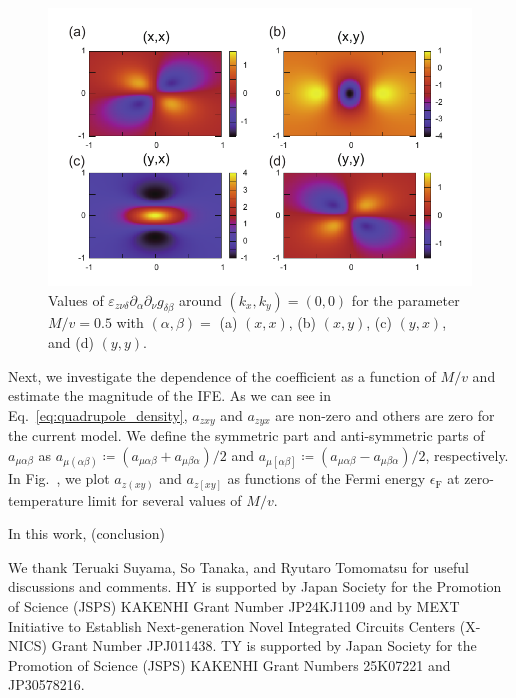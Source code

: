 \documentclass[aps,prb,longbibliography,superscriptaddress,twocolumn]{revtex4-2}
\begin{document}
\begin{figure}[t]
    \begin{center}
        \includegraphics[width=\columnwidth]{fig_IFE/asym_density.pdf}
    \end{center}
    \caption{Values of $\varepsilon_{z\nu\delta}\partial_{\alpha}\partial_{\nu}g_{\delta\beta}$ around $(k_x,k_y)=(0,0)$ for the parameter $M/v=0.5$ with $(\alpha,\beta)=$ (a) $(x,x)$, (b) $(x,y)$, (c) $(y,x)$, and (d) $(y,y)$.}
    \label{fig:asym_density}
\end{figure}

Next, we investigate the dependence of the coefficient as a function of $M/v$ and estimate the magnitude of the IFE. As we can see in Eq.~\eqref{eq:quadrupole_density}, $a_{zxy}$ and $a_{zyx}$ are non-zero and others are zero for the current model. We define the symmetric part and anti-symmetric parts of $a_{\mu\alpha\beta}$ as $a_{\mu(\alpha\beta)}\coloneqq (a_{\mu\alpha\beta}+a_{\mu\beta\alpha})/2$ and $a_{\mu[\alpha\beta]}\coloneqq (a_{\mu\alpha\beta}-a_{\mu\beta\alpha})/2$, respectively. In Fig.~, we plot $a_{z(xy)}$ and $a_{z[xy]}$ as functions of the Fermi energy $\epsilon_\mathrm{F}$ at zero-temperature limit for several values of $M/v$. 


In this work, (conclusion)

We thank Teruaki Suyama, So Tanaka, and Ryutaro Tomomatsu for useful discussions and comments. HY is supported by Japan Society for the Promotion of Science (JSPS) KAKENHI Grant Number JP24KJ1109 and by MEXT Initiative to Establish Next-generation Novel Integrated Circuits Centers (X-NICS) Grant Number JPJ011438. TY is supported by Japan Society for the Promotion of Science (JSPS) KAKENHI Grant Numbers 25K07221 and JP30578216.
\end{document}
